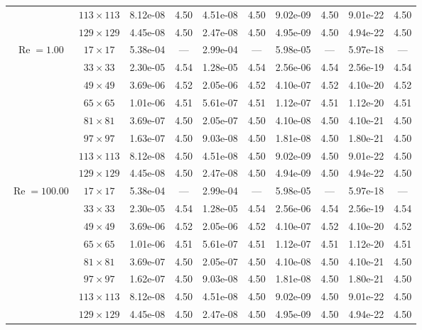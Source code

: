 \documentclass[preprint, 12pt]{elsarticle}
\begin{document}
{\begin{center}
\begin{table}[H]
{\begin{tabular*}{\textwidth}{@{\extracolsep\fill}cccccccccc@{}}
    & $113\times 113$ & 8.12e-08 & 4.50 & 4.51e-08 & 4.50 & 9.02e-09 & 4.50 & 9.01e-22 & 4.50 \\
    & $129\times 129$ & 4.45e-08 & 4.50 & 2.47e-08 & 4.50 & 4.95e-09 & 4.50 & 4.94e-22 & 4.50 \\
    \hline\hline
    \multirow{7}{*}{$\operatorname{Re}=1.00$} & $17\times 17$ & 5.38e-04 & --- & 2.99e-04 & --- & 5.98e-05 & --- & 5.97e-18 & --- \\
    & $33\times 33$ & 2.30e-05 & 4.54 & 1.28e-05 & 4.54 & 2.56e-06 & 4.54 & 2.56e-19 & 4.54 \\
    & $49\times 49$ & 3.69e-06 & 4.52 & 2.05e-06 & 4.52 & 4.10e-07 & 4.52 & 4.10e-20 & 4.52 \\
    \multirow{3}{*}{$\operatorname{Wi}=10$} & $65\times 65$ & 1.01e-06 & 4.51 & 5.61e-07 & 4.51 & 1.12e-07 & 4.51 & 1.12e-20 & 4.51 \\
    & $81\times 81$ & 3.69e-07 & 4.50 & 2.05e-07 & 4.50 & 4.10e-08 & 4.50 & 4.10e-21 & 4.50 \\
    & $97\times 97$ & 1.63e-07 & 4.50 & 9.03e-08 & 4.50 & 1.81e-08 & 4.50 & 1.80e-21 & 4.50 \\
    & $113\times 113$ & 8.12e-08 & 4.50 & 4.51e-08 & 4.50 & 9.02e-09 & 4.50 & 9.01e-22 & 4.50 \\
    & $129\times 129$ & 4.45e-08 & 4.50 & 2.47e-08 & 4.50 & 4.94e-09 & 4.50 & 4.94e-22 & 4.50 \\
    \hline
    \multirow{7}{*}{$\operatorname{Re}=100.00$} & $17\times 17$ & 5.38e-04 & --- & 2.99e-04 & --- & 5.98e-05 & --- & 5.97e-18 & --- \\
    & $33\times 33$ & 2.30e-05 & 4.54 & 1.28e-05 & 4.54 & 2.56e-06 & 4.54 & 2.56e-19 & 4.54 \\
    & $49\times 49$ & 3.69e-06 & 4.52 & 2.05e-06 & 4.52 & 4.10e-07 & 4.52 & 4.10e-20 & 4.52 \\
    \multirow{3}{*}{$\operatorname{Wi}=10$} & $65\times 65$ & 1.01e-06 & 4.51 & 5.61e-07 & 4.51 & 1.12e-07 & 4.51 & 1.12e-20 & 4.51 \\
    & $81\times 81$ & 3.69e-07 & 4.50 & 2.05e-07 & 4.50 & 4.10e-08 & 4.50 & 4.10e-21 & 4.50 \\
    & $97\times 97$ & 1.62e-07 & 4.50 & 9.03e-08 & 4.50 & 1.81e-08 & 4.50 & 1.80e-21 & 4.50 \\
    & $113\times 113$ & 8.12e-08 & 4.50 & 4.51e-08 & 4.50 & 9.02e-09 & 4.50 & 9.01e-22 & 4.50 \\
    & $129\times 129$ & 4.45e-08 & 4.50 & 2.47e-08 & 4.50 & 4.95e-09 & 4.50 & 4.94e-22 & 4.50 \\

\end{tabular*}}
\end{table}
\end{center}}
\end{document}
